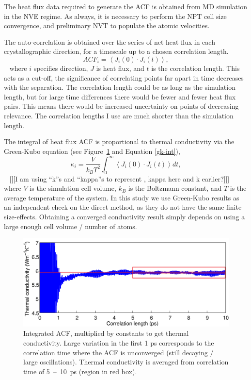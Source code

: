 The heat flux data required to generate the ACF is obtained from MD simulation in the NVE regime. As always, it is necessary to perform the NPT cell size convergence, and preliminary NVT to populate the atomic velocities.

The auto-correlation is obtained over the series of net heat flux in each crystallographic direction, for a timescale up to a chosen correlation length. 
~
\begin{equation}
ACF_i = \left \langle J_i(0) \cdot  J_i(t) \right \rangle,
\label{acf-j}
\end{equation}
~
where $i$ specifies direction, $J$ is heat flux, and $t$ is the correlation length. This acts as a cut-off, the significance of correlating points far apart in time decreases with the separation. The correlation length could be as long as the simulation length, but for large time differences there would be fewer and fewer heat flux pairs. This means there would be increased uncertainty on points of decreasing relevance. The correlation lengths I use are much shorter than the simulation length.  

The integral of heat flux ACF is proportional to thermal conductivity via the Green-Kubo equation (see Figure~\ref{fig:gk_int} and Equation \ref{gk-int}), 
~
\begin{equation}
\kappa_i = \frac{V}{k_{B}T^{2}} \int_{0}^{\infty} \left \langle J_i(0) \cdot  J_i(t) \right \rangle dt ,
\label{gk-int}
\end{equation}
~
[[[I am using ``k''s and ``kappa''s to represent \tc, kappa here and k earlier?]]] where $V$ is the simulation cell volume, $k_B$ is the Boltzmann constant, and $T$ is the average temperature of the system. In this study we use Green-Kubo results as an independent check on the direct method, as they do not have the same finite size-effects. Obtaining a converged conductivity result simply depends on using a large enough cell volume / number of atoms. 

\begin{figure}[h]
\includegraphics[width=\linewidth]{Figures/gk_int.png}
\caption{Integrated ACF, multiplied by constants to get thermal conductivity. Large variation in the first 1 ps corresponds to the correlation time where the ACF is unconverged (still decaying / large oscillations). Thermal conductivity is averaged from correlation time of 5~--~10~ps (region in red box).}
\label{fig:gk_int}
\end{figure}






